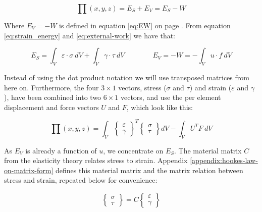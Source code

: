 \begin{equation}
\prod (x,y,z) = E_S + E_V = E_S - W
\end{equation}

Where $E_V = -W$ is defined in equation
\eqref{eq:EW} on page \pageref{eq:EW}. From equation
\eqref{eq:strain_energy} and \eqref{eq:external-work} we have that:

\begin{equation*}
E_S =  \int_V \varepsilon \cdot \sigma \ dV
+ \int_V \gamma \cdot \tau \ dV
\qquad \qquad E_V = - W = - \int_V u \cdot f \ dV
\end{equation*}

Instead of using the dot product notation we will use transposed
matrices from here on. Furthermore, the four $3 \times 1$ vectors,
stress ($\sigma$ and $\tau$) and strain ($\varepsilon$ and $\gamma$),
have been combined into two $6 \times 1$ vectors, and use the per
element displacement and force vectors $U$ and $F$, which look like
this:

\begin{equation}
\prod (x,y,z) =  \int_V 
\begin{Bmatrix}
\varepsilon \\
\gamma
\end{Bmatrix}
^T
\begin{Bmatrix}
\sigma \\
\tau
\end{Bmatrix}
dV - \int_V U^T F \ dV
\end{equation}

As $E_V$ is already a function of $u$, we concentrate on $E_S$.
The material matrix $C$ from the elasticity theory relates
stress to strain. Appendix \ref{appendix:hookes-law-on-matrix-form}
defines this material matrix and the matrix relation between stress
and strain, repeated below for convenience:

\begin{equation*}
\begin{Bmatrix}
\sigma \\
\tau
\end{Bmatrix}
= C 
\begin{Bmatrix}
\varepsilon \\
\gamma
\end{Bmatrix}
\end{equation*}


